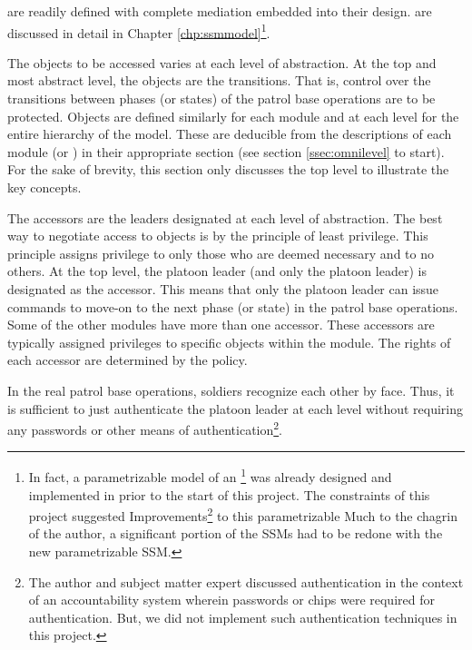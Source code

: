 \documentclass[../../main/main.tex]{subfiles}
\begin{document}
 are readily defined with complete mediation embedded into their design.   are discussed in detail in Chapter \ref{chp:ssmmodel}\footnote{In fact, a parametrizable model of an \footnote{This SSM was modeled and implemented in HOL by Professor Shiu-kai Chin and used with his permission.} was already designed and implemented in  prior to the start of this project.  The constraints of this project suggested Improvements\footnote{Because these improvements were significant, the original author (Professor Shiu-kai Chin) made them.} to this parametrizable Much to the chagrin of the author, a significant portion of the SSMs had to be redone with the new parametrizable SSM.}.

The objects to be accessed varies at each level of abstraction. At the top and most abstract level, the objects are the transitions.  That is, control over the transitions between phases (or states) of the patrol base operations are to be protected.  Objects are defined similarly for each module and at each level for the entire hierarchy of the model.  These are deducible from the descriptions of each module (or ) in their appropriate section (see section \ref{ssec:omnilevel} to start).  For the sake of brevity, this section only discusses the top level to illustrate the key concepts.  

The accessors are the leaders designated at each level of abstraction.  The best way to negotiate access to objects is by the principle of least privilege.  This principle assigns privilege to only those who are deemed necessary and to no others.  At the top level, the platoon leader (and only the platoon leader) is designated as the accessor. This means that only the platoon leader can issue commands to move-on to the next phase (or state) in the patrol base operations. Some of the other modules have more than one accessor.  These accessors are typically assigned privileges to specific objects within the module.  The rights of each accessor are determined by the policy.

In the real patrol base operations, soldiers recognize each other by face.  Thus, it is sufficient to just authenticate the platoon leader at each level without requiring any passwords or other means of authentication\footnote{The author and subject matter expert discussed authentication in the context of an accountability system wherein passwords or chips were required for authentication.  But, we did not implement such authentication techniques in this project.}.
\end{document}
